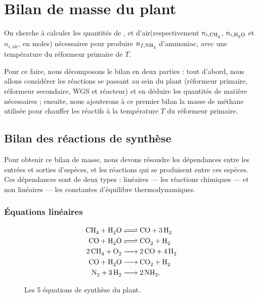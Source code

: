\section{Bilan de masse du plant}

On cherche à calculer les quantités de ,  et d'air\footnotemark (respectivement $n_{i,\ce{CH4}}$, $n_{i,\ce{H2O}}$ et $n_{i,\text{air}}$, en moles) nécessaires pour produire $n_{f,\ce{NH3}}$\;\mole{} d'ammoniac, avec une température du réformeur primaire de $T$\;\kelvin{}.

Pour ce faire, nous décomposons le bilan en deux parties : tout d'abord, nous allons considérer les réactions se passant au sein du plant (réformeur primaire, réformeur secondaire, WGS et réacteur) et en déduire les quantités de matière nécessaires ; ensuite, nous ajouterons à ce premier bilan la masse de méthane utilisée pour chauffer les réactifs à la température $T$ du réformeur primaire.


\subsection{Bilan des réactions de synthèse}



Pour obtenir ce bilan de masse, nous devons résoudre les dépendances entre les entrées et sorties d'espèces, et les réactions qui se produisent entre ces espèces. Ces dépendances sont de deux types : linéaires --- les réactions chimiques --- et non linéaires --- les constantes d'équilibre thermodynamiques.

\subsubsection{Équations linéaires}

\begin{figure}[h]
    \begingroup
    \addtolength{\jot}{.5em}
    \begin{align}
      \cee{
         CH4 +  H2O &<=>  CO  + 3H2 \\
         CO  +  H2O &<=>  CO2 +  H2 \\
        2CH4 +  O2  &-> 2CO + 4H2 \\
         CO  +  H2O &->  CO2 +  H2\\
         N2  + 3H2  &-> 2NH3
      }
      \text.
    \end{align}
    \endgroup

    \caption{Les 5 équations de synthèse du plant.}
\end{figure}

